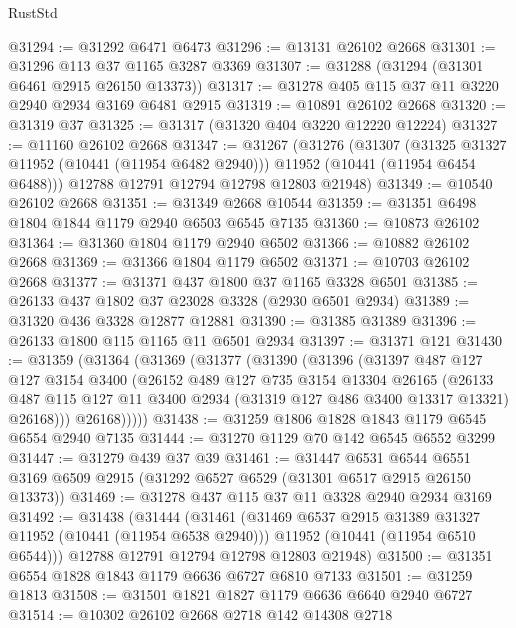 \begin{lexlean}{RustStd}
\begin{coremodule}
@31294 := @31292 @6471 @6473
@31296 := @13131 @26102 @2668
@31301 := @31296 @113 @37 @1165 @3287 @3369
@31307 := @31288 (@31294 (@31301 @6461 @2915 @26150 @13373))
@31317 := @31278 @405 @115 @37 @11 @3220 @2940 @2934 @3169 @6481 @2915
@31319 := @10891 @26102 @2668
@31320 := @31319 @37
@31325 := @31317 (@31320 @404 @3220 @12220 @12224)
@31327 := @11160 @26102 @2668
@31347 := @31267
    (@31276
      (@31307
        (@31325 @31327 @11952 (@10441 (@11954 @6482 @2940)))
        @11952
        (@10441 (@11954 @6454 @6488)))
      @12788
      @12791
      @12794
      @12798
      @12803
      @21948)
@31349 := @10540 @26102 @2668
@31351 := @31349 @2668 @10544
@31359 := @31351 @6498 @1804 @1844 @1179 @2940 @6503 @6545 @7135
@31360 := @10873 @26102
@31364 := @31360 @1804 @1179 @2940 @6502
@31366 := @10882 @26102 @2668
@31369 := @31366 @1804 @1179 @6502
@31371 := @10703 @26102 @2668
@31377 := @31371 @437 @1800 @37 @1165 @3328 @6501
@31385 := @26133 @437 @1802 @37 @23028 @3328 (@2930 @6501 @2934)
@31389 := @31320 @436 @3328 @12877 @12881
@31390 := @31385 @31389
@31396 := @26133 @1800 @115 @1165 @11 @6501 @2934
@31397 := @31371 @121
@31430 := @31359
    (@31364
      (@31369
        (@31377
          (@31390
            (@31396
              (@31397
                @487
                @127
                @127
                @3154
                @3400
                (@26152
                  @489
                  @127
                  @735
                  @3154
                  @13304
                  @26165
                  (@26133
                    @487
                    @115
                    @127
                    @11
                    @3400
                    @2934
                    (@31319 @127 @486 @3400 @13317 @13321)
                    @26168)))
              @26168)))))
@31438 := @31259 @1806 @1828 @1843 @1179 @6545 @6554 @2940 @7135
@31444 := @31270 @1129 @70 @142 @6545 @6552 @3299
@31447 := @31279 @439 @37 @39
@31461 := @31447
    @6531
    @6544
    @6551
    @3169
    @6509
    @2915
    (@31292 @6527 @6529 (@31301 @6517 @2915 @26150 @13373))
@31469 := @31278 @437 @115 @37 @11 @3328 @2940 @2934 @3169
@31492 := @31438
    (@31444
      (@31461
        (@31469 @6537 @2915 @31389 @31327 @11952 (@10441 (@11954 @6538 @2940)))
        @11952
        (@10441 (@11954 @6510 @6544)))
      @12788
      @12791
      @12794
      @12798
      @12803
      @21948)
@31500 := @31351 @6554 @1828 @1843 @1179 @6636 @6727 @6810 @7133
@31501 := @31259 @1813
@31508 := @31501 @1821 @1827 @1179 @6636 @6640 @2940 @6727
@31514 := @10302 @26102 @2668 @2718 @142 @14308 @2718

\end{coremodule}
\end{lexlean}
